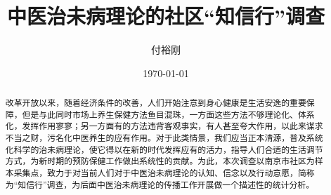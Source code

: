\documentclass{ctexart}
\title{中医治未病理论的社区“知信行”调查}
\author{付裕刚}
\date{\today}
\begin{document}
	\maketitle
	\begin{abstract}
	改革开放以来，随着经济条件的改善，人们开始注意到身心健康是生活安逸的重要保障，但是与此同时市场上养生保健方法鱼目混珠，一方面这些方法不够理论化、体系化，发挥作用寥寥；另一方面有的方法违背客观事实，有人甚至夸大作用，以此来谋求不当之财，污名化中医养生的应有作用。对于此类情景，我们应当正本清源，普及系统化科学的治未病理论，使它得以在新的时代发挥应有的活力，指导人们合适的生活调节方式，为新时期的预防保健工作做出系统性的贡献。为此，本次调查以南京市社区为样本采集点，致力于对当前人们对于中医治未病理论的认知、信念以及行动意愿，简称为“知信行”调查，为后面中医治未病理论的传播工作开展做一个描述性的统计分析。
	\end{abstract}
\tableofcontents




\printbibliography

\end{document}
